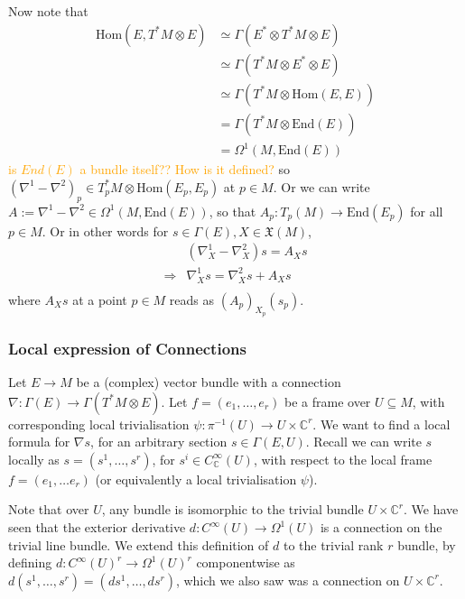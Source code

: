\documentclass[a4paper]{article}
\theoremstyle{definition} \newtheorem*{definition}{Definition}
\theoremstyle{definition} \newtheorem*{definitions}{Definitions}
\theoremstyle{plain} \newtheorem{theorem}{Theorem}[section]
\theoremstyle{plain} \newtheorem{proposition}[theorem]{Proposition}
\theoremstyle{plain} \newtheorem{corollary}[theorem]{Corollary}
\theoremstyle{plain} \newtheorem{lemma}[theorem]{Lemma}
\theoremstyle{plain} \newtheorem{example}[theorem]{Example}
\newcommand{\understandBetter}[1]{\textcolor{orange}{#1}}
\newcommand{\complexnos}{\mathbb{C}}
\newcommand{\smoothCmaps}{C^\infty_\complexnos (U)}
\newcommand{\Hom}{\text{Hom}}
\newcommand{\smooth}{C^\infty}
\begin{document}
Now note that 
\begin{align*}
\Hom (E, T^*M\otimes E) & \simeq \Gamma(E^* \otimes T^*M\otimes E) \\
& \simeq \Gamma(T^*M\otimes E^* \otimes E) \\
& \simeq \Gamma(T^*M \otimes \Hom(E, E)) \\
& = \Gamma(T^*M \otimes \text{End}(E)) \\
& = \Omega^1(M, \text{End}(E))
\end{align*}
\understandBetter{is $End(E)$ a bundle itself?? How is it defined?}
so $(\nabla^1-\nabla^2)_p\in T^*_pM\otimes \Hom(E_p, E_p)$ at $p\in M$. Or we can write $A:=\nabla^1-\nabla^2 \in \Omega^1(M, \text{End}(E))$, so that 
$A_p:T_p(M)\to \text{End}(E_p)$ for all $p\in M$. Or in other words for $s\in \Gamma(E), X\in \mathfrak{X}(M)$,
\begin{align*}
& (\nabla^1_X - \nabla^2_X)s = A_X s \\
\Rightarrow & \nabla^1_X s = \nabla^2_X s + A_X s \\
\end{align*}
where $A_X s$ at a point $p\in M$ reads as $(A_p)_{X_p} (s_p)$.

\subsubsection{Local expression of Connections}
Let $E\to M$ be a (complex) vector bundle with a connection $\nabla:\Gamma(E)\to \Gamma(T^*M\otimes E)$.  Let $f=(e_1, \ldots, e_r)$ be a frame over $U\subseteq M$, with corresponding local trivialisation $\psi:\pi^{-1}(U)\to U\times \complexnos^r$. 
We want to find a local formula for $\nabla s$,  for an arbitrary section $s\in \Gamma(E, U)$.
Recall we can write $s$ locally as $s=(s^1, \ldots,  s^r)$,  for $s^i\in \smoothCmaps$,  with respect to the local frame $f=(e_1, \ldots e_r)$ (or equivalently a local trivialisation $\psi$).

Note that over $U$, any bundle is isomorphic to the trivial bundle $U\times \complexnos^r$. We have seen that the exterior derivative $d:\smooth(U)\to \Omega^1(U)$ is a connection on the trivial line bundle. We extend this definition of $d$ to the trivial rank $r$ bundle, by defining $d: \smooth(U)^r\to \Omega^1(U)^r$ componentwise as $d(s^1, \ldots, s^r) = (ds^1, \ldots, ds^r)$, which we also saw was a connection on $U\times \complexnos^r$. 
\end{document}
